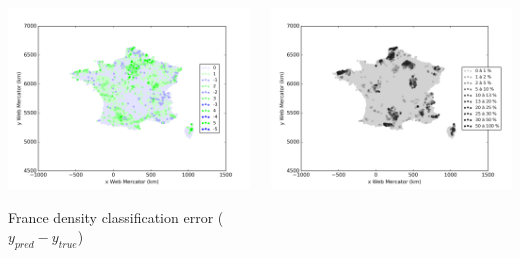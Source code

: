 \documentclass[c]{beamer}
\begin{document}
\begin{frame}
\begin{columns}
 \begin{column}{0.5\textwidth}
  \begin{overlayarea}{\linewidth}{4cm}
    \centering\vfill
     \includegraphics[scale=0.25]{../../data/France/test/Neural_Network_Classification-oversampling/Neural_Network_Classification-oversampling/density_classification_error.png}
  \end{overlayarea}
  \begin{overlayarea}{\linewidth}{0.5cm}
    \centering
    \tiny France density classification error ($y_{pred}-y_{true}$)\par
  \end{overlayarea}
 \end{column}
 \begin{column}{0.5\textwidth}
  \begin{overlayarea}{\linewidth}{4cm}
    \centering\vfill
    \includegraphics[scale=0.25]{../../data/France/test/Neural_Network_Classification-oversampling/Neural_Network_Classification-oversampling/density_covering.png}

\end{overlayarea}
\end{column}
\end{columns}
\end{frame}
\end{document}
